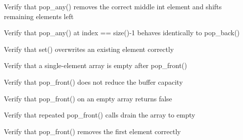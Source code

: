 \begin{DoxyRefList}
%
Verify that pop\+\_\+any() removes the correct middle int element and shifts remaining elements left  
\item[Global \doxylink{test__array_8cpp_aefe119f8f242b6caf7c2582f5d1c4ed7}{TEST\+\_\+F} (\doxylink{classArrayInitTest}{Array\+Init\+Test}, Pop\+Any\+At\+Last\+Index\+Matches\+Pop\+Back)]\label{test__test000048}%
%
Verify that pop\+\_\+any() at index == size()-\/1 behaves identically to pop\+\_\+back()  
\item[Global \doxylink{test__array_8cpp_a57b4385a252deca6feecea8d288399a4}{TEST\+\_\+F} (\doxylink{classArrayInitTest}{Array\+Init\+Test}, Set\+Point\+Overwrites\+Existing\+Element)]\label{test__test000057}%
%
Verify that set() overwrites an existing  element correctly  
\item[Global \doxylink{test__array_8cpp_a3f4c5f603b93826dfa999b4139d5b3b9}{TEST\+\_\+F} (\doxylink{classArrayInitTest}{Array\+Init\+Test}, Pop\+Front\+Single\+Element\+Leaves\+Array\+Empty)]\label{test__test000046}%
%
Verify that a single-\/element array is empty after pop\+\_\+front()  
\item[Global \doxylink{test__array_8cpp_a45bb0ca094189770a6e01b4a0609a42a}{TEST\+\_\+F} (\doxylink{classArrayInitTest}{Array\+Init\+Test}, Pop\+Front\+Does\+Not\+Reduce\+Capacity)]\label{test__test000045}%
%
Verify that pop\+\_\+front() does not reduce the buffer capacity  
\item[Global \doxylink{test__array_8cpp_a92ffd15574bad0dce81902c5b2dc1d22}{TEST\+\_\+F} (\doxylink{classArrayInitTest}{Array\+Init\+Test}, Pop\+Front\+On\+Empty\+Array\+Returns\+False)]\label{test__test000044}%
%
Verify that pop\+\_\+front() on an empty array returns false  
\item[Global \doxylink{test__array_8cpp_a62ff35eb10308912dee4d55770855c9d}{TEST\+\_\+F} (\doxylink{classArrayInitTest}{Array\+Init\+Test}, Pop\+Front\+Drains\+To\+Empty)]\label{test__test000043}%
%
Verify that repeated pop\+\_\+front() calls drain the array to empty  
\item[Global \doxylink{test__array_8cpp_a4e95b6c60e221d3cacdbb5a524c549f9}{TEST\+\_\+F} (\doxylink{classArrayInitTest}{Array\+Init\+Test}, Pop\+Front\+Point\+Removes\+First\+Element)]\label{test__test000042}%
%
Verify that pop\+\_\+front() removes the first  element correctly  

\end{DoxyRefList}
